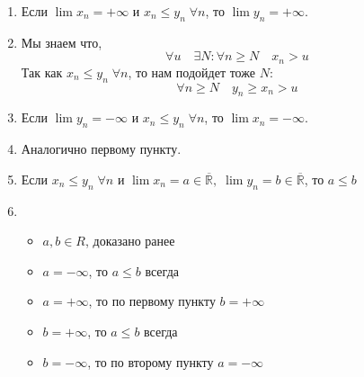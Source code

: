 \documentclass[12pt,letterpaper]{report}
\makeatletter
\theoremstyle{definition}
\renewenvironment{proof}[1][\proofname]{%
   \par\pushQED{\qed}\normalfont%
   \topsep6\p@\@plus6\p@\relax
   \trivlist\item[\hskip\labelsep\bfseries#1\@addpunct{.}]%
   \ignorespaces
}{%
   \popQED\endtrivlist\@endpefalse
}
\makeatother
\begin{document}
    \begin{enumerate}
        \item Если $\lim x_n = +\infty$ и $x_n \leqslant y_n \;\forall n$, то $\lim y_n = +\infty$.
        \begin{proof}
            Мы знаем что,
            \[ \forall u\quad \exists N: \forall n \geqslant N \quad x_n > u  \]
            Так как $x_n \leqslant y_n \;\forall n$, то нам подойдет тоже $N$:
            \[ \forall n \geqslant N \quad y_n \geqslant x_n > u  \]
        \end{proof}
        \item Если $\lim y_n = -\infty$ и $x_n \leqslant y_n \;\forall n$, то $\lim x_n = -\infty$.
        \begin{proof}
            Аналогично первому пункту.
        \end{proof}
        \item Если $x_n \leqslant y_n \;\forall n$ и $\lim x_n = a \in \overline{\mathbb{R}},\; \lim y_n = b \in \overline{\mathbb{R}}$, то $a \leqslant b$
        \begin{proof} \quad \\
        \begin{itemize}
            \item $a, b \in R$, доказано ранее
            \item $a = -\infty$, то $a \leqslant b$ всегда
            \item $a = +\infty$, то по первому пункту $b = +\infty$
            \item $b = +\infty$, то $a \leqslant b$ всегда
            \item $b = -\infty$, то по второму пункту $a = -\infty$
        \end{itemize}
        \end{proof}
    \end{enumerate}
    
\end{document}
